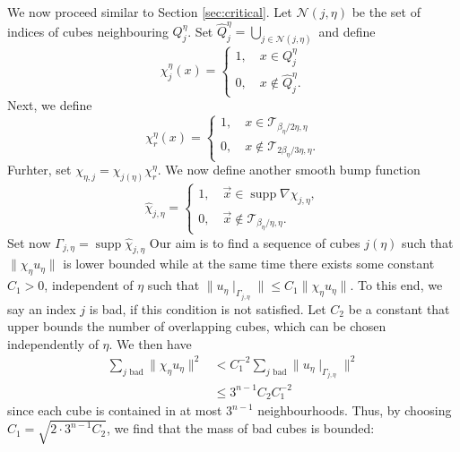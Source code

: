 \documentclass[a4paper,reqno]{amsart}
\numberwithin{equation}{section}
\numberwithin{equation}{section}		%
\numberwithin{figure}{section}			%
\numberwithin{table}{section}				%
\theoremstyle{definition}
\renewcommand{\hat}{\widehat}
\newcommand{\<}{\ensuremath \leq}
\renewcommand{\>}{\ensuremath \geq}
\renewcommand{\hat}{\widehat}
\begin{document}
We now proceed similar to Section \ref{sec:critical}. Let $\mathcal{N}(j,\eta)$ be the set of indices of cubes neighbouring $Q_j^\eta$. Set $\hat{Q}_j^\eta = \bigcup_{j\in\mathcal{N}(j,\eta)}$ and define
\begin{equation}
    \chi^\eta_j(x) = \begin{cases}
        1,\quad x\in Q_j^\eta\\
        0,\quad x\notin \hat{Q}_j^\eta. 
    \end{cases}
\end{equation}
Next, we define
\begin{equation}
    \chi^\eta_r(x) = \begin{cases}
        1,\quad x\in\mathcal{T}_{\beta_\eta/2\eta,\eta}\\
        0,\quad x\notin\mathcal{T}_{2\beta_\eta/3\eta,\eta}.
    \end{cases}
\end{equation}
Furhter, set $\chi_{\eta,j}=\chi_{j(\eta)}\chi^\eta_r.$ We now define another smooth bump function 
\begin{equation}
    \hat{\chi}_{j,\eta}=\begin{cases}
        1, \quad \vec{x}\in\operatorname{supp}\nabla\chi_{j,\eta},\\
        0, \quad \vec{x}\notin\mathcal{T}_{\beta_\eta/\eta,\eta}.
    \end{cases}
\end{equation}
Set now $\Gamma_{j,\eta}=\operatorname{supp}\hat{\chi}_{j,\eta}$
Our aim is to find a sequence of cubes $j(\eta)$ such that $\lVert \chi_\eta u_\eta\rVert$ is lower bounded while at the same time there exists some constant $C_1>0$, independent of $\eta$ such that $\lVert u_\eta\mid_{\Gamma_{j,\eta}}\rVert\leq C_1\lVert \chi_\eta u_\eta\rVert$. To this end, we say an index $j$ is bad, if
this condition is not satisfied. Let $C_2$ be a constant that upper bounds the number of overlapping cubes, which can be chosen independently of $\eta$. We then have
\begin{equation}
   \begin{aligned}
        \sum_{j \text{ bad}}\lVert\chi_\eta u_\eta\rVert^2 &< C_1^{-2}\sum_{j \text{ bad}}\lVert u_\eta\mid_{\Gamma_{j,\eta}}\rVert^2\\
        &\leq 3^{n-1}C_2C_1^{-2}
   \end{aligned}
\end{equation}
since each cube is contained in at most $3^{n-1}$ neighbourhoods. Thus, by choosing $C_1=\sqrt{2\cdot3^{n-1}C_2}$, we find that the mass of bad cubes is bounded:
\end{document}
